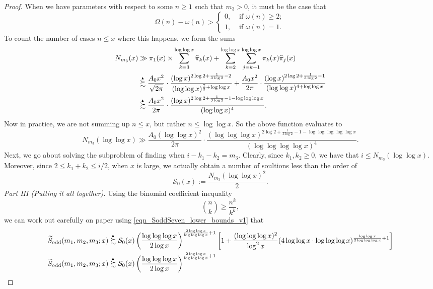 \documentclass[11pt,reqno,a4letter]{article}
\numberwithin{figure}{section}
\numberwithin{table}{section}
\theoremstyle{plain}
\numberwithin{theorem}{section}
\theoremstyle{definition}
\newcommand{\NBRef}[1]{
     \todo[linecolor=green!85!white,backgroundcolor=orange!50!white,bordercolor=blue!30!black,textcolor=cyan!15!black,shadow,size=\small,fancyline]{
     \color{NBRefColor}{\textbf{#1}
     }
     }
}
\newcommand{\SuccSim}[0]{\overset{_{\scriptsize{\blacktriangle}}}{\succsim}}
\begin{document}
\begin{proof}
\NBRef{A09-2020.04-26} 
When we have parameters with respect to some $n \geq 1$ 
such that $m_3 > 0$, it must be the case that 
\[
\Omega(n) - \omega(n) > \begin{cases} 
     0, & \text{ if $\omega(n) \geq 2$; } \\ 
     1, & \text{ if $\omega(n) = 1$. } 
     \end{cases}
\]
To count the number of cases $n \leq x$ where this happens, we form the sums 
\begin{align*} 
N_{m_3}(x) & \gg \pi_1(x) \times \sum_{k=3}^{\log\log x} \widehat{\pi}_k(x) + 
     \sum_{k=2}^{\log\log x} \sum_{j=k+1}^{\log\log x} 
     \pi_k(x) \widehat{\pi}_j(x) \\ 
     & \SuccSim \frac{A_0 x^2}{\sqrt{2\pi}} \cdot 
     \frac{(\log x)^{2\log 2+\frac{1}{3\log 2} - 2}}{(\log\log x)^{\frac{7}{2} + \log\log x}} + 
     \frac{A_0 x^2}{2\pi} \cdot 
     \frac{(\log x)^{2\log 2+\frac{1}{3\log 2} - 1}}{(\log\log x)^{4 + \log\log x}} \\ 
     & \SuccSim \frac{A_0 x^2}{2\pi} \cdot 
     \frac{(\log x)^{2\log 2+\frac{1}{3\log 2} - 1 - \log\log\log x}}{(\log\log x)^{4}}. 
\end{align*} 
Now in practice, we are not summing up $n \leq x$, but rather $n \leq \log\log x$. So the 
above function evaluates to 
\[
N_{m_3}(\log\log x) \gg\frac{A_0 (\log\log x)^2}{2\pi} \cdot 
     \frac{(\log\log\log x)^{2\log 2+\frac{1}{3\log 2} - 1 - \log\log\log\log\log x}}{(\log\log\log\log x)^{4}}. 
\]
Next, we go about solving the subproblem of finding when $i-k_1-k_2 = m_3$. 
Clearly, since $k_1,k_2 \geq 0$, we have that $i \leq N_{m_3}(\log\log x)$. 
Moreover, since $2 \leq k_1+k_2 \leq i/2$, when $x$ is large, we actually obtain a number of 
soultions less than the order of 
\[
\mathcal{S}_0(x) := \frac{N_{m_3}(\log\log x)^2}{2}. 
\]
\textit{Part III (Putting it all together). } 
Using the binomial coefficient inequality 
\[
\binom{n}{k} \geq \frac{n^k}{k^k}, 
\]
we can work out carefully on paper using \eqref{eqn_SoddSeven_lower_bounds_v1} that 
\begin{align*} 
\widetilde{S}_{\operatorname{odd}}(m_1, m_2, m_3; x) & \SuccSim 
     \mathcal{S}_0(x) \left(\frac{\log\log\log x}{2 \log x}\right)^{\frac{2\log\log x}{\log\log\log x}+1} 
     \left[1 + \frac{(\log\log\log x)^2}{\log^2 x} 
     (4 \log\log x \cdot \log\log\log x)^{\frac{\log\log x}{2 \log\log\log x} + 1}\right] \\ 
\widetilde{S}_{\operatorname{odd}}(m_1, m_2, m_3; x) & \SuccSim 
     \mathcal{S}_0(x) \left(\frac{\log\log\log x}{2 \log x}\right)^{\frac{2\log\log x}{\log\log\log x}+1} 

\end{align*}
\end{proof}
\end{document}

